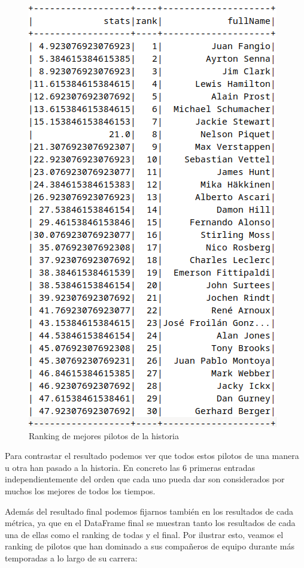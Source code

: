 \documentclass[12pt,twoside,titlepage]{report}
\begin{document}
\begin{figure}[H]
	\includegraphics[scale=0.3]{results/bestdrivers/bestdrivers.png}
	\centering
	\caption{Ranking de mejores pilotos de la historia}
	\label{fig:bestDrivers}
	\centering
\end{figure}

Para contrastar el resultado podemos ver que todos estos pilotos de una manera u otra han pasado a la historia. En concreto las 6 primeras entradas independientemente del orden que cada uno pueda dar son considerados por muchos los mejores de todos los tiempos.

Además del resultado final podemos fijarnos también en los resultados de cada métrica, ya que en el DataFrame final se muestran tanto los resultados de cada una de ellas como el ranking de todas y el final. Por ilustrar esto, veamos el ranking de pilotos que han dominado a sus compañeros de equipo durante más temporadas a lo largo de su carrera:
\end{document}
